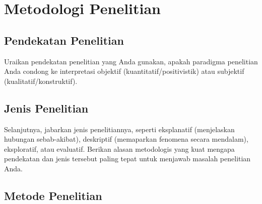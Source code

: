 
\chapter{Metodologi Penelitian}


%
%
\section{Pendekatan Penelitian}

Uraikan pendekatan penelitian yang Anda gunakan, apakah paradigma penelitian Anda condong ke interpretasi objektif (kuantitatif/positivistik) atau subjektif (kualitatif/konstruktif).



%
%
\section{Jenis Penelitian}

Selanjutnya, jabarkan jenis penelitiannya, seperti eksplanatif (menjelaskan hubungan sebab-akibat), deskriptif (memaparkan fenomena secara mendalam), eksploratif, atau evaluatif. Berikan alasan metodologis yang kuat mengapa pendekatan dan jenis tersebut paling tepat untuk menjawab masalah penelitian Anda.



\section{Metode Penelitian}


